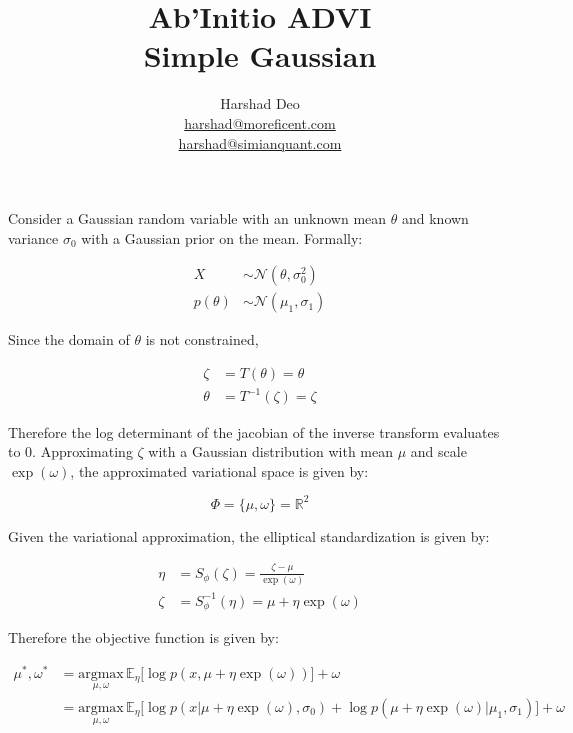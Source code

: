 \documentclass[10pt]{article}
\title{Ab'Initio ADVI \\ Simple Gaussian}
\author{Harshad Deo \\ 
  \href{mailto:harshad@moreficent.com}{harshad@moreficent.com} \\ 
  \href{mailto:harshad@simianquant.com}{harshad@simianquant.com}
}
\date{}
\begin{document}
  
\maketitle

Consider a Gaussian random variable with an unknown mean $\theta$ and known variance $\sigma_0$ with a Gaussian
prior on the mean. Formally:

\begin{align*}
  X &\sim \mathcal{N}(\theta, \sigma_0^2)\\
  p(\theta) &\sim \mathcal{N}(\mu_1, \sigma_1)
\end{align*}

Since the domain of $\theta$ is not constrained, 

\begin{align*}
  \zeta &= T(\theta) = \theta \\
  \theta &= T^{-1}(\zeta) = \zeta
\end{align*}

Therefore the log determinant of the jacobian of the inverse transform evaluates to 0. Approximating $\zeta$ with a 
Gaussian distribution with mean $\mu$ and scale $\exp(\omega)$, the approximated variational space is given by:

\begin{equation*}
  \Phi = \{\mu, \omega\} = \mathbb{R}^2
\end{equation*}

Given the variational approximation, the elliptical standardization is given by:

\begin{align*}
  \eta &= S_{\phi}(\zeta) = \frac{\zeta - \mu}{\exp(\omega)} \\
  \zeta &= S_{\phi}^{-1}(\eta) = \mu + \eta \exp(\omega)
\end{align*}

Therefore the objective function is given by:

\begin{align*}
  \mu^*, \omega^* &= \underset{\mu, \omega}{\text{argmax}}\,\mathbb{E}_\eta\big[\log p(x, \mu + \eta\exp(\omega)) \big] + \omega \\
  &= \underset{\mu, \omega}{\text{argmax}}\,\mathbb{E}_\eta\big[\log p(x | \mu + \eta\exp(\omega), \sigma_0) + \log p(\mu + \eta \exp(\omega)|\mu_1, \sigma_1)] + \omega 
\end{align*}
\end{document}
